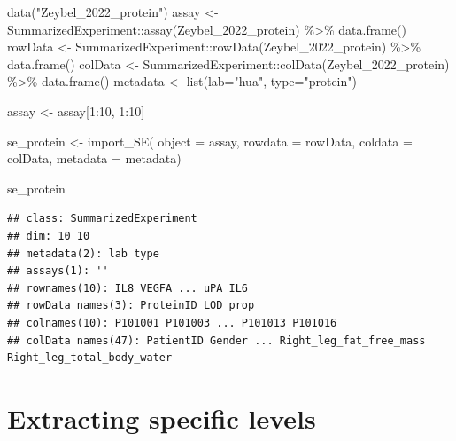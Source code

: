 \documentclass[
]{book}
\newenvironment{Shaded}{\begin{snugshade}}{\end{snugshade}}
\newcommand{\AttributeTok}[1]{\textcolor[rgb]{0.77,0.63,0.00}{#1}}
\newcommand{\DecValTok}[1]{\textcolor[rgb]{0.00,0.00,0.81}{#1}}
\newcommand{\FunctionTok}[1]{\textcolor[rgb]{0.00,0.00,0.00}{#1}}
\newcommand{\NormalTok}[1]{#1}
\newcommand{\OtherTok}[1]{\textcolor[rgb]{0.56,0.35,0.01}{#1}}
\newcommand{\SpecialCharTok}[1]{\textcolor[rgb]{0.00,0.00,0.00}{#1}}
\newcommand{\StringTok}[1]{\textcolor[rgb]{0.31,0.60,0.02}{#1}}
\begin{document}
\begin{Shaded}
\begin{Highlighting}[]
\FunctionTok{data}\NormalTok{(}\StringTok{"Zeybel\_2022\_protein"}\NormalTok{)}
\NormalTok{assay }\OtherTok{\textless{}{-}}\NormalTok{ SummarizedExperiment}\SpecialCharTok{::}\FunctionTok{assay}\NormalTok{(Zeybel\_2022\_protein) }\SpecialCharTok{\%\textgreater{}\%}
  \FunctionTok{data.frame}\NormalTok{()}
\NormalTok{rowData }\OtherTok{\textless{}{-}}\NormalTok{ SummarizedExperiment}\SpecialCharTok{::}\FunctionTok{rowData}\NormalTok{(Zeybel\_2022\_protein) }\SpecialCharTok{\%\textgreater{}\%}
  \FunctionTok{data.frame}\NormalTok{()}
\NormalTok{colData }\OtherTok{\textless{}{-}}\NormalTok{ SummarizedExperiment}\SpecialCharTok{::}\FunctionTok{colData}\NormalTok{(Zeybel\_2022\_protein) }\SpecialCharTok{\%\textgreater{}\%}
  \FunctionTok{data.frame}\NormalTok{()}
\NormalTok{metadata }\OtherTok{\textless{}{-}} \FunctionTok{list}\NormalTok{(}\AttributeTok{lab=}\StringTok{"hua"}\NormalTok{, }\AttributeTok{type=}\StringTok{"protein"}\NormalTok{)}

\NormalTok{assay }\OtherTok{\textless{}{-}}\NormalTok{ assay[}\DecValTok{1}\SpecialCharTok{:}\DecValTok{10}\NormalTok{, }\DecValTok{1}\SpecialCharTok{:}\DecValTok{10}\NormalTok{]}

\NormalTok{se\_protein }\OtherTok{\textless{}{-}} \FunctionTok{import\_SE}\NormalTok{(}
    \AttributeTok{object =}\NormalTok{ assay,}
    \AttributeTok{rowdata =}\NormalTok{ rowData,}
    \AttributeTok{coldata =}\NormalTok{ colData,}
    \AttributeTok{metadata =}\NormalTok{ metadata)}

\NormalTok{se\_protein}
\end{Highlighting}
\end{Shaded}

\begin{verbatim}
## class: SummarizedExperiment 
## dim: 10 10 
## metadata(2): lab type
## assays(1): ''
## rownames(10): IL8 VEGFA ... uPA IL6
## rowData names(3): ProteinID LOD prop
## colnames(10): P101001 P101003 ... P101013 P101016
## colData names(47): PatientID Gender ... Right_leg_fat_free_mass Right_leg_total_body_water
\end{verbatim}

\hypertarget{extracting-specific-levels}{%
\section{Extracting specific levels}\label{extracting-specific-levels}}
\end{document}

